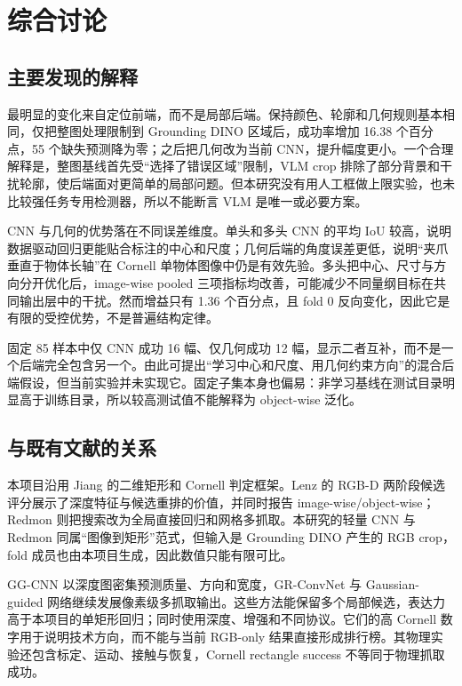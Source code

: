 \documentclass{l4proj}
\begin{document}
\chapter{综合讨论}

\section{主要发现的解释}
最明显的变化来自定位前端，而不是局部后端。保持颜色、轮廓和几何规则基本相同，仅把整图处理限制到 Grounding DINO 区域后，成功率增加 16.38 个百分点，55 个缺失预测降为零；之后把几何改为当前 CNN，提升幅度更小。一个合理解释是，整图基线首先受“选择了错误区域”限制，VLM crop 排除了部分背景和干扰轮廓，使后端面对更简单的局部问题。但本研究没有用人工框做上限实验，也未比较强任务专用检测器，所以不能断言 VLM 是唯一或必要方案。

CNN 与几何的优势落在不同误差维度。单头和多头 CNN 的平均 IoU 较高，说明数据驱动回归更能贴合标注的中心和尺度；几何后端的角度误差更低，说明“夹爪垂直于物体长轴”在 Cornell 单物体图像中仍是有效先验。多头把中心、尺寸与方向分开优化后，image-wise pooled 三项指标均改善，可能减少不同量纲目标在共同输出层中的干扰。然而增益只有 1.36 个百分点，且 fold 0 反向变化，因此它是有限的受控优势，不是普遍结构定律。

固定 85 样本中仅 CNN 成功 16 幅、仅几何成功 12 幅，显示二者互补，而不是一个后端完全包含另一个。由此可提出“学习中心和尺度、用几何约束方向”的混合后端假设，但当前实验并未实现它。固定子集本身也偏易：非学习基线在测试目录明显高于训练目录，所以较高测试值不能解释为 object-wise 泛化。

\section{与既有文献的关系}
本项目沿用 Jiang 的二维矩形和 Cornell 判定框架\citep{jiang2011efficient}。Lenz 的 RGB-D 两阶段候选评分展示了深度特征与候选重排的价值，并同时报告 image-wise/object-wise\citep{lenz2015deep}；Redmon 则把搜索改为全局直接回归和网格多抓取\citep{redmon2015real}。本研究的轻量 CNN 与 Redmon 同属“图像到矩形”范式，但输入是 Grounding DINO 产生的 RGB crop，fold 成员也由本项目生成，因此数值只能有限可比。

GG-CNN 以深度图密集预测质量、方向和宽度\citep{morrison2018closing}，GR-ConvNet 与 Gaussian-guided 网络继续发展像素级多抓取输出\citep{kumra2020antipodal,li2022gaussian}。这些方法能保留多个局部候选，表达力高于本项目的单矩形回归；同时使用深度、增强和不同协议。它们的高 Cornell 数字用于说明技术方向，而不能与当前 RGB-only 结果直接形成排行榜。其物理实验还包含标定、运动、接触与恢复，Cornell rectangle success 不等同于物理抓取成功。
\end{document}
